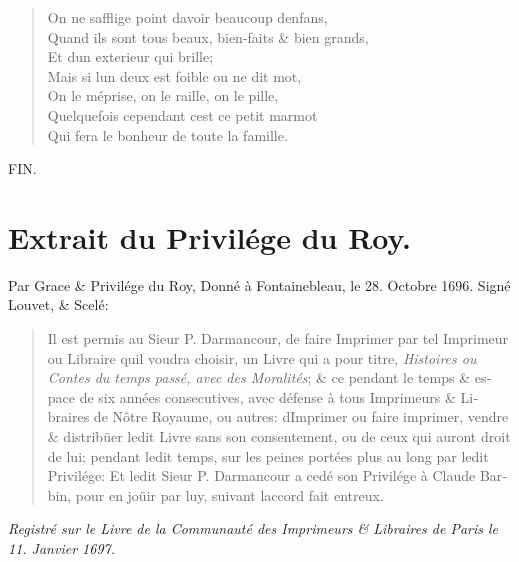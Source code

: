 \documentclass[14pt,a4paper]{memoir}
\begin{document}
{{\begin{otherlanguage}{french}
\begin{verse}
On ne s\textquotesingle afflige point d\textquotesingle avoir beaucoup d\textquotesingle enfans, \\
Quand ils sont tous beaux, bien-faits \& bien grands, \\
Et d\textquotesingle un exterieur qui brille; \\
Mais si l\textquotesingle un d\textquotesingle eux est foible ou ne dit mot, \\
On le méprise, on le raille, on le pille, \\
Quelquefois cependant c\textquotesingle est ce petit marmot \\
Qui fera le bonheur de toute la famille.
\end{verse}

\vspace{2cm}

\begin{center}
  {\LARGE \scshape FIN.}
\end{center}

\clearpage
\thispagestyle{plain}
\section*{Extrait du Privilége du Roy.}

\begin{itshape}
Par Grace \& Privilége du Roy, Donné à Fontainebleau, le 28. Octobre
1696. Signé {Louvet}, \& Scelé:

\begin{quotation}
Il est permis au Sieur {P. Darmancour},
de faire Imprimer par tel Imprimeur ou Libraire qu\textquotesingle il
voudra choisir, un Livre qui a pour titre, \emph{Histoires ou Contes du
temps passé, avec des Moralités}; \& ce pendant le temps \& espace de
six années consecutives, avec défense à tous Imprimeurs \& Libraires de
Nôtre Royaume, ou autres: d\textquotesingle Imprimer ou faire imprimer,
vendre \& distribüer ledit Livre sans son consentement, ou de ceux qui
auront droit de lui; pendant ledit temps, sur les peines portées plus au
long par ledit Privilége: Et ledit Sieur P. Darmancour a cedé son
Privilége à Claude Barbin, pour en joüir par luy, suivant
l\textquotesingle accord fait entr\textquotesingle eux.
\end{quotation}

\begin{flushright}
\emph{Registré sur le Livre de la Communauté des Imprimeurs \& Libraires
de Paris le 11. Janvier 1697.}


\end{flushright}
\end{itshape}
\end{otherlanguage}}}
\end{document}
